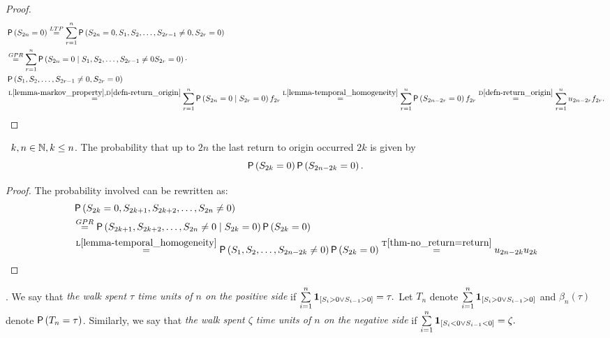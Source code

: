 \begin{proof}
  \[
    \begin{split}
      & \pr \left(S_{2n}=0\right)
      \ltp \suma[r][1][n] \pr \left(S_{2n}=0,S_1, S_2, \ldots, S_{2r-1}\neq 0, S_{2r}=0\right)\\
      & \gpr \suma[r][1][n] \pr \left(S_{2n}=0 \Mid S_1, S_2, \ldots, S_{2r-1}\neq 0 S_{2r}=0\right)\cdot\\
      &\pr \left(S_1, S_2, \ldots, S_{2r-1}\neq 0, S_{2r}=0\right)\\
      & \overset{\text{L}\ref{lemma-markov_property} \text{,D}\ref{defn-return_origin}}{=}\suma[r][1][n] \pr \left(S_{2n}=0 \Mid S_{2r}=0\right) f_{2r}
      \overset{\text{L}\ref{lemma-temporal_homogeneity}}{=}\suma[r][1][n]
      \pr \left(S_{2n-2r}=0\right) f_{2r}\overset{\text{D}\ref{defn-return_origin}}{=}
      \suma[r][1][n] u_{2n-2r}f_{2r}.
    \end{split}
  \]
\end{proof}
\begin{thm}\label{thm-arcsine_last_visits}
 \Lrws\ $k,n \in \mathbb{N}, k\leq n$.
 The probability that up to \Time $2n$ the last return to origin occurred \intime $2k$ is given by
\[
\operatorname{\mathsf{P}}\left( S_{2k}=0\right)\operatorname{\mathsf{P}}\left( S_{2n-2k}=0\right).
\]
\end{thm}
\begin{proof}
 The probability involved can be rewritten as:
 \[
  \begin{split}
    & \operatorname{\mathsf{P}} \left(S_{2k}=0, S_{2k+1}, S_{2k+2}, \ldots, S_{2n} \neq 0\right)\\
    & \overset{GPR}{=} \operatorname{\mathsf{P}} \left( S_{2k+1}, S_{2k+2}, \ldots, S_{2n}\neq 0\mid S_{2k}=0 \right) \operatorname{\mathsf{P}} \left( S_{2k}=0 \right)\\
    & \overset{\text{L}\ref{lemma-temporal_homogeneity}}{=}\operatorname{\mathsf{P}} \left( S_{1}, S_{2}, \ldots, S_{2n-2k}\neq 0 \right) \operatorname{\mathsf{P}} \left( S_{2k}=0 \right)
    \overset{\text{T}\ref{thm-no_return=return}}{=}u_{2n-2k}u_{2k}
  \end{split}
\]
\end{proof}
\begin{defn}\label{defn-time_spent_positive_side}

 \Lrw. We say that \emph{the walk spent $\tau$ time units of $n$ on the positive side} if $\suma \indikator{S_i>0 \lor S_{i-1}>0}=\tau.$
 Let $T_n$ denote $\suma \indikator{S_i>0 \lor S_{i-1}>0}$ and $\beta_{n} \left( \tau \right)$ denote $\operatorname{\mathsf{P}}\left(T_n=\tau \right)$.
 Similarly, we say that \emph{the walk spent $\zeta$ time units of $n$ on the negative side} if
 $\suma\indikator{S_i<0 \lor S_{i-1}<0}=\zeta.$
\end{defn}


